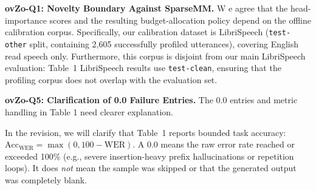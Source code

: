 \documentclass[sigconf,authordraft]{acmart}
\newcommand{\question}[3]{
    \vspace{0.4em}
    \noindent\textbf{\color{#1}#2} #3
}
\begin{document}
\vspace{-2mm}
\question{revovZo}{ovZo-Q1: Novelty Boundary Against SparseMM.}
We agree that the head-importance scores and the resulting budget-allocation policy depend on the offline calibration corpus. Specifically, our calibration dataset is LibriSpeech (\texttt{test-other} split, containing 2,605 successfully profiled utterances), covering English read speech only. Furthermore, this corpus is disjoint from our main LibriSpeech evaluation: Table~1 LibriSpeech results use \texttt{test-clean}, ensuring that the profiling corpus does not overlap with the evaluation set.


\vspace{-3mm}
\question{revovZo}{ovZo-Q5: Clarification of 0.0 Failure Entries.}{The 0.0 entries and metric handling in Table 1 need clearer explanation.}
In the revision, we will clarify that Table~1 reports bounded task accuracy:
$ \mathrm{Acc}_{\mathrm{WER}}=\max(0, 100-\mathrm{WER})$.
A 0.0 means the raw error rate reached or exceeded 100\% (e.g., severe insertion-heavy prefix hallucinations or repetition loops). It does \emph{not} mean the sample was skipped or that the generated output was completely blank.
\end{document}

